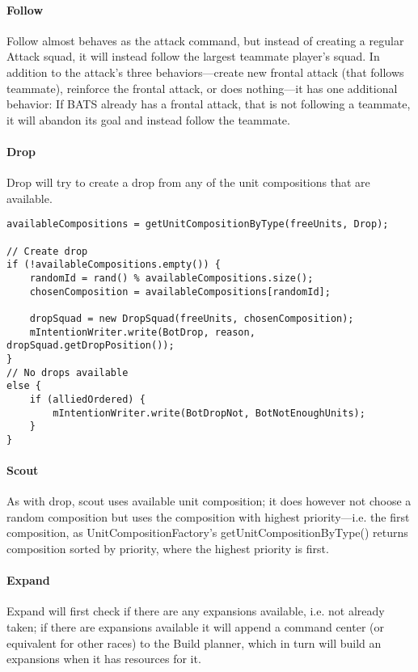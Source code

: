 \paragraph{Follow}
Follow almost behaves as the attack command, but instead of creating a regular Attack squad, it will instead follow the largest teammate player’s squad. In addition to the attack’s three behaviors—create new frontal attack (that follows teammate), reinforce the frontal attack, or does nothing—it has one additional behavior: If BATS already has a frontal attack, that is not following a teammate, it will abandon its goal and instead follow the teammate.

\paragraph{Drop}
Drop will try to create a drop from any of the unit compositions that are available.
\begin{lstlisting}[label={lst:order_drop},caption={Pseudo-code for the drop command}]
availableCompositions = getUnitCompositionByType(freeUnits, Drop);

// Create drop
if (!availableCompositions.empty()) {
	randomId = rand() % availableCompositions.size();
	chosenComposition = availableCompositions[randomId];

	dropSquad = new DropSquad(freeUnits, chosenComposition);
	mIntentionWriter.write(BotDrop, reason, dropSquad.getDropPosition());
}
// No drops available
else {
	if (alliedOrdered) {
		mIntentionWriter.write(BotDropNot, BotNotEnoughUnits);
	}
}
\end{lstlisting}

\paragraph{Scout}
As with drop, scout uses available unit composition; it does however not choose a random composition but uses the composition with highest priority—i.e. the first composition, as UnitCompositionFactory’s getUnitCompositionByType() returns composition sorted by priority, where the highest priority is first.

\paragraph{Expand}
Expand will first check if there are any expansions available, i.e. not already taken; if there are expansions available it will append a command center (or equivalent for other races) to the Build planner, which in turn will build an expansions when it has resources for it.

